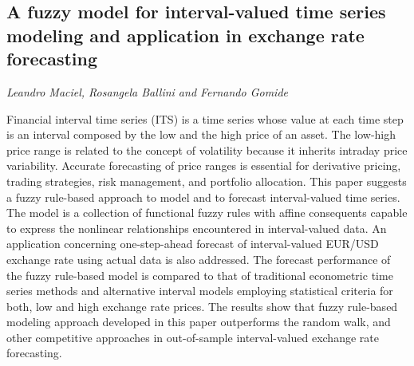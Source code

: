 \documentclass[../booklet.tex]{subfiles}
\begin{document}
\subsection[A fuzzy model for interval-valued time series modeling and application in exchange rate forecasting. {\it Leandro Maciel, Rosangela Ballini and Fernando Gomide}]{A fuzzy model for interval-valued time series modeling and application in exchange rate forecasting}
  

\begin{center}
  {\it Leandro Maciel, Rosangela Ballini and Fernando Gomide}
\end{center}


 Financial interval time series (ITS) is a time series whose value at each time step is an interval composed by the low and the high price of an asset. The low-high price range is related to the concept of volatility because it inherits intraday price variability. Accurate forecasting of price ranges is essential for derivative pricing, trading strategies, risk management, and portfolio allocation. This paper suggests a fuzzy rule-based approach to model and to forecast interval-valued time series. The model is a collection of functional fuzzy rules with affine consequents capable to express the nonlinear relationships encountered in interval-valued data. An application concerning one-step-ahead forecast of interval-valued EUR/USD exchange rate using actual data is also addressed.  The forecast performance of the fuzzy rule-based model is compared to that of traditional econometric time series methods and alternative interval models employing statistical criteria for both, low and high exchange rate prices. The results show that fuzzy rule-based modeling approach developed in this paper outperforms the random walk, and other competitive approaches in out-of-sample interval-valued exchange rate forecasting.

\end{document}
